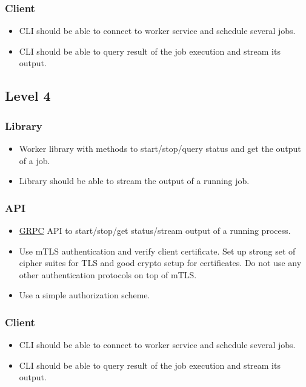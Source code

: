 \documentclass{article}
\begin{document}
  \subsubsection*{Client}
  \begin{itemize}
  \item[] CLI should be able to connect to worker service and schedule several jobs.
  \item[] CLI should be able to query result of the job execution and stream its output.
  \end{itemize}

  \subsection*{Level 4}

  \subsubsection*{Library}
  \begin{itemize}
  \item[] Worker library with methods to start/stop/query status and get the output of a job.
  \item[] Library should be able to stream the output of a running job.
  \end{itemize}

  \subsubsection*{API}
  \begin{itemize}
  \item[] \href{https://grpc.io}{GRPC} API to start/stop/get status/stream output of a running process.
  \item[] Use mTLS authentication and verify client certificate. Set up strong set of cipher suites for TLS and good crypto setup for certificates. Do not use any other authentication protocols on top of mTLS.
  \item[] Use a simple authorization scheme.
  \end{itemize}

  \subsubsection*{Client}
  \begin{itemize}
  \item[] CLI should be able to connect to worker service and schedule several jobs.
  \item[] CLI should be able to query result of the job execution and stream its output.
  \end{itemize}
\end{document}
